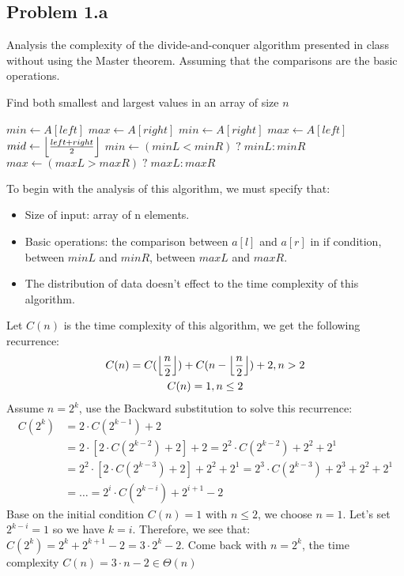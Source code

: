 \documentclass[a4paper]{article}
\DeclarePairedDelimiter\floor{\lfloor}{\rfloor}
\begin{document}
\subsection{Problem 1.a}
Analysis the complexity of the divide-and-conquer algorithm presented in class without using the Master theorem. Assuming that the comparisons are the basic operations. \par
\begin{algorithm}
\renewcommand{\thealgorithm}{}
\caption{Find both smallest and largest values in an array of size $n$}
\begin{algorithmic}
            \State $min \gets A[left]$
            \State $max \gets A[right]$
        \Else
            \State $min \gets A[right]$
            \State $max \gets A[left]$
        \EndIf
    \Else
        \State $mid \gets \floor*{\frac{left+right}{2}}$
        \State {}
        \State {}
        \State $min \gets (minL < minR) \; ? \; minL : minR$
        \State $max \gets (maxL > maxR) \; ? \; maxL : maxR$
    \EndIf
\EndProcedure
\end{algorithmic}
\end{algorithm}
To begin with the analysis of this algorithm, we must specify that: 
\begin{itemize}
    \item Size of input: array of n elements.
    \item Basic operations: the comparison between $a[l]$ and $a[r]$ in if condition, between $minL$ and $minR$, between $maxL$ and $maxR$.
    \item The distribution of data doesn't effect to the time complexity of this algorithm.
\end{itemize}
Let $C(n)$ is the time complexity of this algorithm, we get the following recurrence: 
\begin{gather*}
    C(n) = C(\floor*{\frac{n}{2}}) + C(n-\floor*{\frac{n}{2}}) + 2, n > 2 \\ 
    C(n) = 1, n \leq 2
\end{gather*}
Assume $n=2^k$, use the Backward substitution to solve this recurrence: 
\begin{equation*}
    \begin{aligned}
      C(2^k) & = 2 \cdot C(2^{k-1}) + 2 \\ 
             & = 2 \cdot [2 \cdot C(2^{k-2}) + 2] + 2 = 2^2 \cdot C(2^{k-2}) + 2^2 + 2^1 \\ 
             & = 2^2 \cdot [2 \cdot C(2^{k-3}) + 2] + 2^2+2^1 = 2^3 \cdot C(2^{k-3}) + 2^3 + 2^2+2^1 \\ 
             & = \ldots = 2^i \cdot C(2^{k-i}) + 2^{i+1} - 2
    \end{aligned}
\end{equation*}
Base on the initial condition $C(n) = 1$ with $n \leq 2$, we choose $n = 1$. Let's set $2^{k-i} = 1$ so we have $k=i$. Therefore, we see that: $C(2^k) = 2^k + 2^{k+1} - 2 = 3 \cdot 2^k - 2$. Come back with $n = 2^k$, the time complexity $C(n) = 3 \cdot n - 2 \in \Theta(n)$
\end{document}

